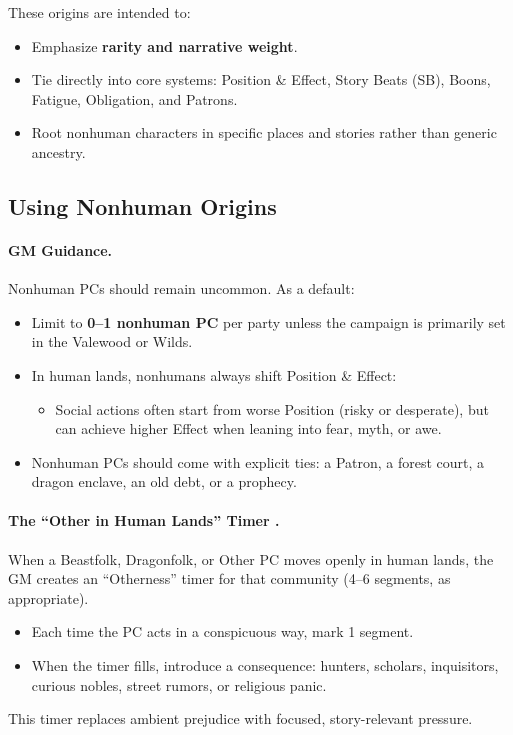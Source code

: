 \documentclass[11pt]{book}
\begin{document}
These origins are intended to:
\begin{itemize}
  \item Emphasize \textbf{rarity and narrative weight}.
  \item Tie directly into core systems: Position \& Effect, Story Beats (SB), Boons, Fatigue, Obligation, and Patrons.
  \item Root nonhuman characters in specific places and stories rather than generic ancestry.
\end{itemize}

\subsection{Using Nonhuman Origins}
\label{subsec:nonhuman_usage}

\paragraph{GM Guidance.}
Nonhuman PCs should remain uncommon. As a default:
\begin{itemize}
  \item Limit to \textbf{0--1 nonhuman PC} per party unless the campaign is primarily set in the Valewood or Wilds.
  \item In human lands, nonhumans always shift Position \& Effect:
        \begin{itemize}
          \item Social actions often start from worse Position (risky or desperate),
                but can achieve higher Effect when leaning into fear, myth, or awe.
        \end{itemize}
  \item Nonhuman PCs should come with explicit ties: a Patron, a forest court, a dragon enclave, an old debt, or a prophecy.
\end{itemize}

\paragraph{The ``Other in Human Lands'' Timer .}
When a Beastfolk, Dragonfolk, or Other PC moves openly in human lands, the GM creates an ``Otherness'' timer for that community (4--6 segments, as appropriate).
\begin{itemize}
  \item Each time the PC acts in a conspicuous way, mark 1 segment.
  \item When the timer fills, introduce a consequence: hunters, scholars, inquisitors, curious nobles, street rumors, or religious panic.
\end{itemize}
This timer replaces ambient prejudice with focused, story-relevant pressure.
\end{document}
